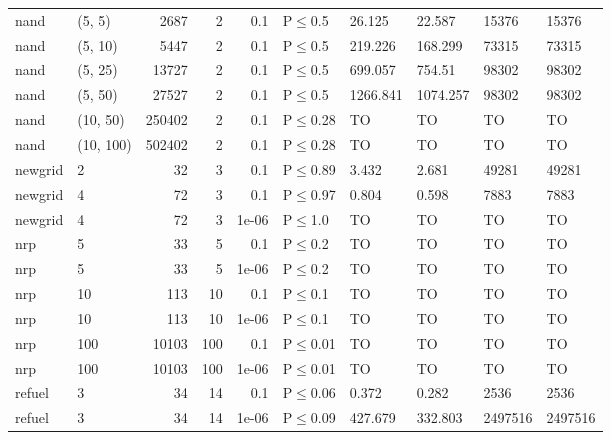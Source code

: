 \begin{longtable}{llrrrlllll}
 nand          & (5, 5)    &   	2687 &   2 & 0.1   & P$\leq$0.5   & 26.125   & 22.587   & 15376   & 15376   \\
 nand          & (5, 10)   &   	5447 &   2 & 0.1   & P$\leq$0.5   & 219.226  & 168.299  & 73315   & 73315   \\
 nand          & (5, 25)   &  	13727 &   2 & 0.1   & P$\leq$0.5   & 699.057  & 754.51   & 98302   & 98302   \\
 nand          & (5, 50)   &  	27527 &   2 & 0.1   & P$\leq$0.5   & 1266.841 & 1074.257 & 98302   & 98302   \\
 nand          & (10, 50)  & 	250402 &   2 & 0.1   & P$\leq$0.28  & TO       & TO       & TO      & TO      \\
 nand          & (10, 100) & 	502402 &   2 & 0.1   & P$\leq$0.28  & TO       & TO       & TO      & TO      \\
 newgrid       & 2         &     	32 &   3 & 0.1   & P$\leq$0.89  & 3.432    & 2.681    & 49281   & 49281   \\
 newgrid       & 4         &     	72 &   3 & 0.1   & P$\leq$0.97  & 0.804    & 0.598    & 7883    & 7883    \\
 newgrid       & 4         &     	72 &   3 & 1e-06 & P$\leq$1.0   & TO       & TO       & TO      & TO      \\
 nrp           & 5         &     	33 &   5 & 0.1   & P$\leq$0.2   & TO       & TO       & TO      & TO      \\
 nrp           & 5         &     	33 &   5 & 1e-06 & P$\leq$0.2   & TO       & TO       & TO      & TO      \\
 nrp           & 10        &    	113 &  10 & 0.1   & P$\leq$0.1   & TO       & TO       & TO      & TO      \\
 nrp           & 10        &    	113 &  10 & 1e-06 & P$\leq$0.1   & TO       & TO       & TO      & TO      \\
 nrp           & 100       &  	10103 & 100 & 0.1   & P$\leq$0.01  & TO       & TO       & TO      & TO      \\
 nrp           & 100       &  	10103 & 100 & 1e-06 & P$\leq$0.01  & TO       & TO       & TO      & TO      \\
 refuel        & 3         &     	34 &  14 & 0.1   & P$\leq$0.06  & 0.372    & 0.282    & 2536    & 2536    \\
 refuel        & 3         &     	34 &  14 & 1e-06 & P$\leq$0.09  & 427.679  & 332.803  & 2497516 & 2497516 \\
\bottomrule
\end{longtable}
